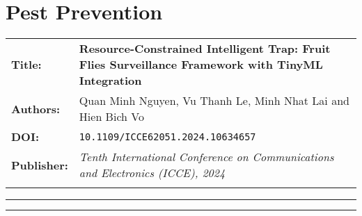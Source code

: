 \documentclass[../main]{subfiles}
\begin{document}
\chapter{Pest Prevention} \label{chp:}


\begin{center}

    \begin{tabularx} {\textwidth} {
            >{\bfseries}m{2.0cm}X
        }

        Title: & \textbf{Resource-Constrained Intelligent Trap: Fruit Flies Surveillance Framework with TinyML Integration}
        \\

        Authors: & Quan Minh Nguyen, Vu Thanh Le, Minh Nhat Lai and Hien Bich Vo
        \\

        DOI: & \texttt{10.1109/ICCE62051.2024.10634657}

        \\

        Publisher: & \textit{Tenth International Conference on Communications and Electronics (ICCE), 2024} \vfill
        \\

        \\


    \end{tabularx}

\end{center}

\begin{center}
    \vspace{-0.75cm}
    \rule{\textwidth}{0.75pt}
\end{center}



\begin{center}
    \vspace{-0.25cm}
    \rule{\textwidth}{0.75pt}
\end{center}





\end{document}
